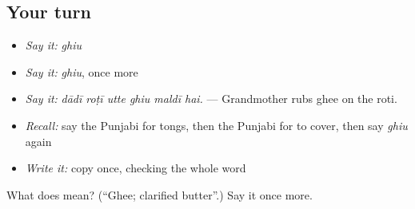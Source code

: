 \subsection*{Your turn}
\begin{itemize}
\raggedright
  \item \emph{Say it:} \emph{ghiu}
  \item \emph{Say it:} \emph{ghiu}, once more
  \item \emph{Say it:} \emph{dādī roṭī utte ghiu maldī hai.} — Grandmother rubs ghee on the roti.
  \item \emph{Recall:} say the Punjabi for tongs, then the Punjabi for to cover, then say \emph{ghiu} again
  \item \emph{Write it:} copy \textbf{} once, checking the whole word
\end{itemize}

\begin{tcolorbox}[breakable,colback=teal!4,colframe=teal!35!black,title={Before you move on}]
What does  mean? (\textquotedblleft{}Ghee; clarified butter\textquotedblright{}.) Say it once more.
\end{tcolorbox}
